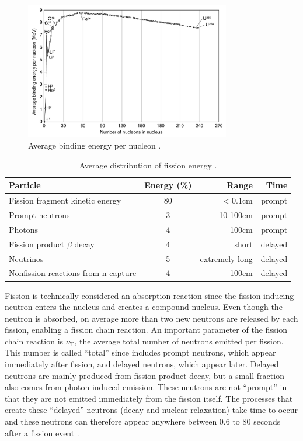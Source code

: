 \begin{figure}[h!]
  \centering
    \includegraphics[width=0.8\textwidth]{graphics/binding_energy.pdf}
     \caption[Average binding energy per nucleon.]{Average binding energy per nucleon \cite{wikimedia_binding}.\label{binding_e_per_nuc}}
\end{figure}

\begin{table}[h]
\centering
\caption[Average distribution of fission energy.]{Average distribution of fission energy \cite{duderstadt}.\label{fission_dist}}
\begin{tabular}{| l | c | r | r |}
\hline
Particle & Energy (\%) & Range & Time \\
\hline
Fission fragment kinetic energy & 80 & $<$0.1cm & prompt \\
\hline
Prompt neutrons & 3 & 10-100cm & prompt \\
\hline
Photons & 4 & 100cm & prompt \\
\hline
Fission product $\beta$ decay & 4 & short & delayed \\
\hline
Neutrinos &  5 & extremely long & delayed \\
\hline
Nonfission reactions from n capture & 4 & 100cm & delayed \\
\hline
\end{tabular}
\end{table}

Fission is technically considered an absorption reaction since the fission-inducing neutron enters the nucleus and creates a compound nucleus.  Even though the neutron is absorbed, on average more than two new neutrons are released by each fission, enabling a fission chain reaction.  An important parameter of the fission chain reaction is $\nu_\mathrm{T}$, the average total number of neutrons emitted per fission.  This number is called ``total'' since includes prompt neutrons, which appear immediately after fission, and delayed neutrons, which appear later.  Delayed neutrons are mainly produced from fission product decay, but a small fraction also comes from photon-induced emission.  These neutrons are not ``prompt'' in that they are not emitted immediately from the fission itself.  The processes that create these ``delayed'' neutrons (decay and nuclear relaxation) take time to occur and these neutrons can therefore appear anywhere between 0.6 to 80 seconds after a fission event \cite{duderstadt}. 

